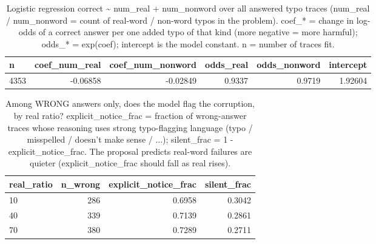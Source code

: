 \documentclass[11pt]{article}
\begin{document}
\begin{table}[H]
\centering
\caption{Logistic regression correct \textasciitilde{} num\_real + num\_nonword over all answered typo traces (num\_real / num\_nonword = count of real-word / non-word typos in the problem). coef\_* = change in log-odds of a correct answer per one added typo of that kind (more negative = more harmful); odds\_* = exp(coef); intercept is the model constant. n = number of traces fit.}
\small
\begin{adjustbox}{max width=\textwidth}
\begin{tabular}{lrrrrr}
\toprule
\textbf{n} & \textbf{coef\_num\_real} & \textbf{coef\_num\_nonword} & \textbf{odds\_real} & \textbf{odds\_nonword} & \textbf{intercept} \\
\midrule
4353 & -0.06858 & -0.02849 & 0.9337 & 0.9719 & 1.92604 \\
\bottomrule
\end{tabular}
\end{adjustbox}
\end{table}

\begin{table}[H]
\centering
\caption{Among WRONG answers only, does the model flag the corruption, by real ratio? explicit\_notice\_frac = fraction of wrong-answer traces whose reasoning uses strong typo-flagging language (typo / misspelled / doesn't make sense / ...); silent\_frac = 1 - explicit\_notice\_frac. The proposal predicts real-word failures are quieter (explicit\_notice\_frac should fall as real rises).}
\small
\begin{adjustbox}{max width=\textwidth}
\begin{tabular}{lrrr}
\toprule
\textbf{real\_ratio} & \textbf{n\_wrong} & \textbf{explicit\_notice\_frac} & \textbf{silent\_frac} \\
\midrule
10 & 286 & 0.6958 & 0.3042 \\
40 & 339 & 0.7139 & 0.2861 \\
70 & 380 & 0.7289 & 0.2711 \\
\bottomrule
\end{tabular}
\end{adjustbox}
\end{table}
\end{document}
